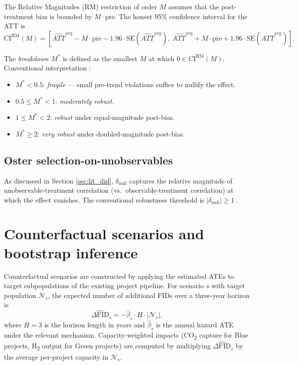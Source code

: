 The Relative Magnitudes (RM) restriction of order $M$ assumes that the post-treatment bias is bounded by $M \cdot \overline{\text{pre}}$. The honest 95\% confidence interval for the ATT is
\begin{equation}
\text{CI}^{\text{RM}}(M) = \left[ \widehat{ATT}^{\text{avg}} - M \cdot \overline{\text{pre}} - 1.96 \cdot \text{SE}(\widehat{ATT}^{\text{avg}}),\ \widehat{ATT}^{\text{avg}} + M \cdot \overline{\text{pre}} + 1.96 \cdot \text{SE}(\widehat{ATT}^{\text{avg}}) \right].
\label{eq:methods_rr_ci}
\end{equation}

The \emph{breakdown $M^*$} is defined as the smallest $M$ at which $0 \in \text{CI}^{\text{RM}}(M)$. Conventional interpretation \cite{rambachan2023more}:
\begin{itemize}[leftmargin=2em]
\item $M^* < 0.5$: \emph{fragile} --- small pre-trend violations suffice to nullify the effect.
\item $0.5 \leq M^* < 1$: \emph{moderately robust}.
\item $1 \leq M^* < 2$: \emph{robust} under equal-magnitude post-bias.
\item $M^* \geq 2$: \emph{very robust} under doubled-magnitude post-bias.
\end{itemize}

\subsection{Oster selection-on-unobservables}

As discussed in Section \ref{sec:lit_did}, $\delta_{\text{null}}$ captures the relative magnitude of unobservable-treatment correlation (vs.\ observable-treatment correlation) at which the effect vanishes. The conventional robustness threshold is $|\delta_{\text{null}}| \geq 1$ \cite{oster2019unobservable}.

\section{Counterfactual scenarios and bootstrap inference}
\label{sec:methods_counterfactual}

Counterfactual scenarios are constructed by applying the estimated ATEs to target subpopulations of the existing project pipeline. For scenario $s$ with target population $\mathcal{N}_s$, the expected number of additional FIDs over a three-year horizon is
\begin{equation}
\widehat{\Delta\text{FID}}_s = -\hat{\beta}_s \cdot H \cdot |\mathcal{N}_s|,
\label{eq:methods_counterfactual}
\end{equation}
where $H = 3$ is the horizon length in years and $\hat{\beta}_s$ is the annual hazard ATE under the relevant mechanism. Capacity-weighted impacts (CO\textsubscript{2} capture for Blue projects, H\textsubscript{2} output for Green projects) are computed by multiplying $\widehat{\Delta\text{FID}}_s$ by the average per-project capacity in $\mathcal{N}_s$.

